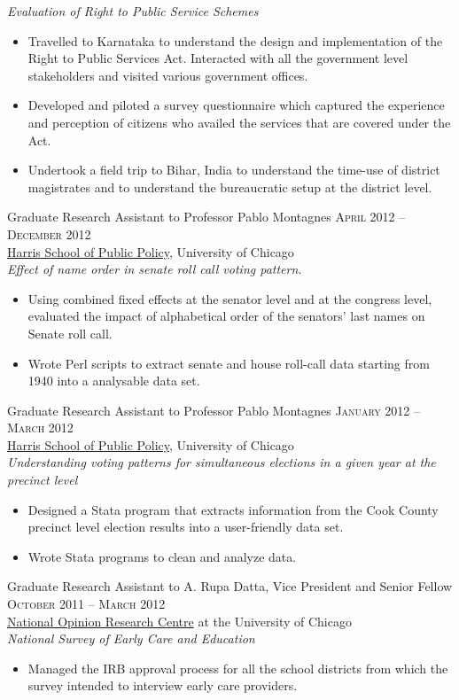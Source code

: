 \documentclass[11pt]{article}
\begin{document}
\emph{Evaluation of Right to Public Service Schemes}
\begin{itemize}
\item Travelled to Karnataka to understand the design and implementation of the Right to Public Services Act. Interacted with all the government level stakeholders and visited various government offices.
\item Developed and piloted a survey questionnaire which captured the experience and perception of citizens who availed the services that are covered under the Act.
\item Undertook a field trip to Bihar, India to understand the time-use of district magistrates and to understand the bureaucratic setup at the district level.
\end{itemize}
\vspace{0.5em}
\pagebreak
Graduate Research Assistant to Professor Pablo Montagnes \hfill
\textsc{April 2012 -- December 2012}\\
\href{http://harrisschool.uchicago.edu/directory/faculty/b-pablo_montagnes}{Harris School of Public Policy}, University of Chicago \\
\emph{Effect of name order in senate roll call voting pattern.}
\begin{itemize}
\item Using combined fixed effects at the senator level and at the
congress level, evaluated the impact of alphabetical order of the
senators' last names on Senate roll call.
\item Wrote Perl scripts to extract senate and house roll-call data starting from 1940 into a analysable data set.
\end{itemize}
\vspace{0.5em}
Graduate Research Assistant to Professor Pablo Montagnes \hfill
\textsc{January 2012 -- March 2012}\\
\href{http://harrisschool.uchicago.edu/directory/faculty/b-pablo_montagnes}{Harris School of Public Policy}, University of Chicago \\
\emph{Understanding voting patterns for simultaneous elections in a given year at the precinct level}
\begin{itemize}
\item Designed a Stata program that extracts information from the Cook
County precinct level election results into a user-friendly data
set.
\item Wrote Stata programs to clean and analyze data.
\end{itemize}
\vspace{0.5em}
Graduate Research Assistant to A. Rupa Datta, Vice President and
Senior Fellow  \hfill \textsc{October 2011 -- March 2012}\\
\href{http://www.norc.org/Research/Projects/Pages/national-survey-of-early-care-and-education.aspx}{National Opinion Research Centre} at the University of Chicago \\
\emph{National Survey of Early Care and Education}
\begin{itemize}
\item Managed the IRB approval process for all the school districts
from which the survey intended to interview early care providers.
\end{itemize}
\end{document}
